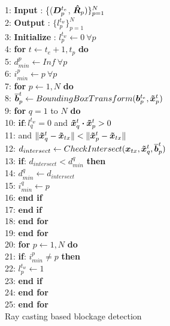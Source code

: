 \documentclass[conference]{IEEEtran}
\begin{document}
\begin{algorithm}[!t]
1: \textbf{Input} :  \{($\bm{D^}{t_e}_p$, $\bm{\Hat{R}}_p)\}_{p=1}^N$ \\
2: \textbf{Output} : $\{l_p^{t_w}\}_{p=1}^N$ \\%
3: \textbf{Initialize} : $ l_p^{t_w} \leftarrow 0\  \forall p$  \\
4: \textbf{for} $t \leftarrow t_{e} + 1 , t_p$ \textbf{do} \\
5: \quad $d_{min}^p \leftarrow Inf \ \forall p$ \\
6: \quad $i_{min}^p \leftarrow p \ \forall p$ \\
7: \quad \textbf{for} $p \leftarrow  1, N$ \textbf{do} \\
8: \quad \quad $\bm{\overline{b}}^t_p \leftarrow BoundingBoxTransform (\bm{b}^{t_e}_p,\bm{\Tilde{x}}^t_p  ) $ \\
9: \quad \quad  \textbf{for} $q= 1 $ to $N$ \textbf{do} \\
10: \quad \quad \quad $\textbf{if}: l_q^{t_w} = 0$ and $\bm{\Tilde{x}}_q^t \boldsymbol{\cdot} \bm{\Tilde{x}}_p^t > 0 $\\
11: \quad \quad \quad \quad \quad \quad \quad \quad \quad and $\| \bm{\Tilde{x}}_q^t - \bm{\Tilde{x}}_{tx}\| < \| \bm{\Tilde{x}}_p^t - \bm{\Tilde{x}}_{tx}\| $\\
12: \quad \quad \quad \quad \quad $d_{intersect} \leftarrow CheckIntersect(\bm{x}_{tx}, \bm{\Tilde{x}}_q^t, \bm{\overline{b}}^t_p)$\\
13: \quad \quad \quad \quad\quad  \textbf{if}: $d_{intersect} < d_{min}^q$ \textbf{then}\\
14: \quad \quad \quad \quad \quad  \quad $d_{min}^q \leftarrow d_{intersect}$\\
15: \quad \quad \quad \quad \quad  \quad $i_{min}^q \leftarrow p$\\
16: \quad \quad \quad \quad\quad  \textbf{end if} \\
17: \quad \quad \quad $\textbf{end if}$  \\
18: \quad \quad \textbf{end for}\\
19: \quad \textbf{end for}\\
20: \quad\textbf{for} $p \leftarrow  1, N$ \textbf{do} \\
21: \quad \quad \textbf{if}: $i_{min}^p \neq p$ \textbf{then} \\
22: \quad \quad  \quad $l_p^{t_w} \leftarrow 1$\\
23: \quad \quad  \textbf{end if} \\
24: \quad \textbf{end for}\\
25: \textbf{end for}\\
\caption{Ray casting based blockage detection}
\label{Algorithm1}
\end{algorithm}
\end{document}
